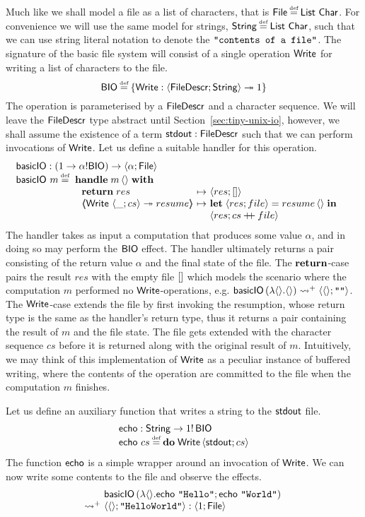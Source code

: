\documentclass[12pt,phd,lfcs,twoside,openright,logo,leftchapter,normalheadings]{infthesis}
\theoremstyle{plain}
\theoremstyle{definition}
\begin{document}
Much like \UNIX{} we shall model a file as a list of characters, that is
$\UFile \defas \List~\Char$. For convenience we will use the same
model for strings, $\String \defas \List~\Char$, such that we can use
string literal notation to denote the $\texttt{"contents of a file"}$.
%
The signature of the basic file system will consist of a single
operation $\mathsf{Write}$ for writing a list of characters to the file.
%
\[
  \BIO \defas \{\Write : \Record{\UFD;\String} \opto \UnitType\}
\]
%
The operation is parameterised by a $\mathsf{FileDescr}$ and a character
sequence. We will leave the $\mathsf{FileDescr}$ type abstract until
Section~\ref{sec:tiny-unix-io}, however, we shall assume the existence
of a term $\mathsf{stdout} : \mathsf{FileDescr}$ such that we can perform invocations of
$\mathsf{Write}$.
%
Let us define a suitable handler for this operation.
%
\[
  \bl
    \basicIO : (\UnitType \to \alpha \eff \BIO) \to \Record{\alpha; \UFile}\\
    \basicIO~m \defas
       \ba[t]{@{~}l}
         \Handle\;m\,\Unit\;\With\\
           ~\ba{@{~}l@{~}c@{~}l}
              \Return\;res &\mapsto& \Record{res;\nil}\\
              \OpCase{\Write}{\Record{\_;cs}}{resume} &\mapsto&
                 \ba[t]{@{}l}
                   \Let\; \Record{res;file} = resume\,\Unit\;\In\\
                   \Record{res; cs \concat file}
                 \ea
           \ea
       \ea
  \el
\]
%
The handler takes as input a computation that produces some value
$\alpha$, and in doing so may perform the $\mathsf{BIO}$ effect.
%
The handler ultimately returns a pair consisting of the return value
$\alpha$ and the final state of the file.
%
The $\mathbf{return}$-case pairs the result $res$ with the empty file $[]$
which models the scenario where the computation $m$ performed no
$\mathsf{Write}$-operations, e.g.
$\mathsf{basicIO}\,(\lambda\langle  \rangle.\langle  \rangle) \leadsto^+
\langle \langle  \rangle;\texttt{""} \rangle$.
%
The $\mathsf{Write}$-case extends the file by first invoking the resumption,
whose return type is the same as the handler's return type, thus it
returns a pair containing the result of $m$ and the file state. The
file gets extended with the character sequence $cs$ before it is
returned along with the original result of $m$.
%
Intuitively, we may think of this implementation of $\mathsf{Write}$ as a
peculiar instance of buffered writing, where the contents of the
operation are committed to the file when the computation $m$ finishes.

Let us define an auxiliary function that writes a string to the
$\mathsf{stdout}$ file.
%
\[
  \bl
    \echo : \String \to \UnitType \eff\, \BIO\\%
    \echo~cs \defas \Do\;\Write\,\Record{\stdout;cs}
  \el
\]
%
The function $\mathsf{echo}$ is a simple wrapper around an invocation of
$\mathsf{Write}$.
%
We can now write some contents to the file and observe the effects.
%
\[
  \ba{@{~}l@{~}l}
                &\basicIO\,(\lambda\Unit. \echo~\strlit{Hello}; \echo~\strlit{World})\\
    \reducesto^+& \Record{\Unit;\strlit{HelloWorld}} : \Record{\UnitType;\UFile}
  \ea
\]
\end{document}
